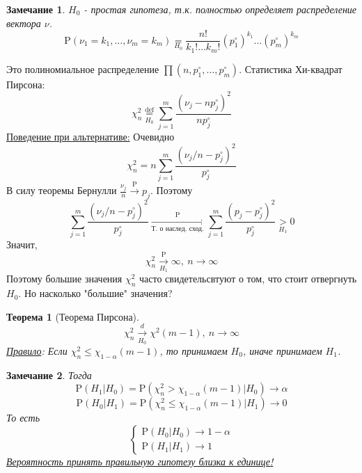\documentclass[12pt]{article}
\newtheorem*{remark*}{Замечание}
\theoremstyle{basic_theorem}
\theoremstyle{name_theorem}
\newtheorem*{named_theorem}{Теорема}
\newcommand*{\defeq}{\stackrel{\text{def}}{=}}
\def\P{ \mathrm{P} }
\begin{document}
    \begin{remark*}
        $H_0$ - простая гипотеза, т.к. полностью определяет распределение
        вектора $\nu$.
        \[ \P(\nu_1=k_1,\ldots,\nu_m=k_m)\underset{H_0}{=}\frac{n!}{k_1!\ldots k_m!}(p_1^\circ)^{k_1}\ldots(p_m^\circ)^{k_m}\]
    \end{remark*}
    Это полиномиальное распределение $\prod(n,p_1^\circ, \ldots, p_m^\circ)$.
    Статистика Хи-квадрат Пирсона:
    \[\chi_n^2\underset{H_0}{\defeq}\sum_{j=1}^m\frac{(\nu_j-np_j^\circ)^2}{np_j^\circ}\]
    \underline{Поведение при альтернативе:} Очевидно
    \[\chi_n^2=n\sum_{j=1}^m\frac{(\nu_j/n-p_j^\circ)^2}{p_j^\circ}\]
    В силу теоремы Бернулли $\frac{\nu_j}{n}\xrightarrow{\P}p_j$.
    Поэтому
    \[\sum_{j=1}^m\frac{(\nu_j/n-p_j^\circ)^2}{p_j^\circ}\xrightarrow[\text{Т. о наслед. сход.}]{\P}\sum_{j=1}^m\frac{(p_j-p_j^\circ)^2}{p_j^\circ}\underset{H_1}{>}0\]
    Значит,
    \[\chi_n^2\xrightarrow[H_1]{\P}\infty,\ n\rightarrow\infty\]
    Поэтому большие значения $\chi_n^2$ часто свидетельсвтуют о том, что
    стоит отвергнуть $H_0$. Но насколько "большие" значения?
    \begin{named_theorem}[Теорема Пирсона]
        \[ \chi_n^2\xrightarrow[H_0]{d}\chi^2(m-1),\ n\rightarrow\infty \]
        \underline{Правило}: Если $\chi_n^2\leq\chi_{1-\alpha}(m-1)$, то принимаем $H_0$,
        иначе принимаем $H_1$.
    \end{named_theorem}
    \begin{remark*} Тогда
        \[\P(H_1\vert H_0)=\P(\chi^2_n>\chi_{1-\alpha}(m-1)\vert H_0)\rightarrow\alpha\]
        \[\P(H_0\vert H_1)=\P(\chi^2_n\leq\chi_{1-\alpha}(m-1)\vert H_1)\rightarrow0\]
        То есть
        \[\begin{cases}
            \P(H_0\vert H_0)\rightarrow1-\alpha \\
            \P(H_1\vert H_1)\rightarrow1
        \end{cases}\]
        \underline{Вероятность принять правильную гипотезу близка к единице!}
    \end{remark*}
\end{document}
